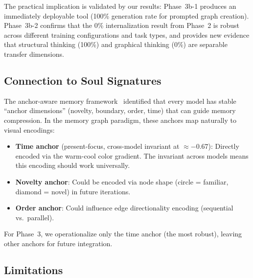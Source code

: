 \documentclass[11pt,a4paper]{article}
\begin{document}
The practical implication is validated by our results: Phase~3b-1 produces an immediately deployable tool (100\% generation rate for prompted graph creation). Phase~3b-2 confirms that the 0\% internalization result from Phase~2 is robust across different training configurations and task types, and provides new evidence that structural thinking (100\%) and graphical thinking (0\%) are separable transfer dimensions.

\subsection{Connection to Soul Signatures}

The anchor-aware memory framework~\cite{soul2026} identified that every model has stable ``anchor dimensions'' (novelty, boundary, order, time) that can guide memory compression. In the memory graph paradigm, these anchors map naturally to visual encodings:

\begin{itemize}[nosep]
\item \textbf{Time anchor} (present-focus, cross-model invariant at $\approx -0.67$): Directly encoded via the warm-cool color gradient. The invariant across models means this encoding should work universally.
\item \textbf{Novelty anchor}: Could be encoded via node shape (circle = familiar, diamond = novel) in future iterations.
\item \textbf{Order anchor}: Could influence edge directionality encoding (sequential vs.\ parallel).
\end{itemize}

For Phase~3, we operationalize only the time anchor (the most robust), leaving other anchors for future integration.

\subsection{Limitations}
\end{document}
